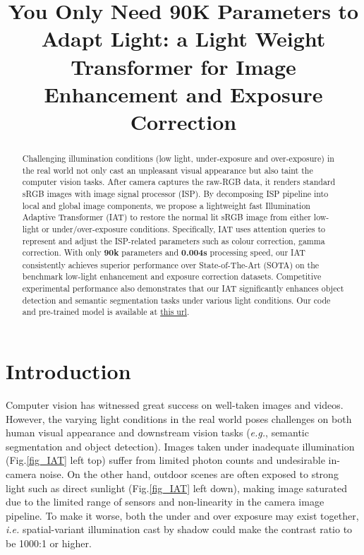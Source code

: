 \documentclass{bmvc2k}
\title{You Only Need 90K Parameters to Adapt Light: a Light Weight Transformer for Image Enhancement and Exposure Correction}
\begin{document}
\maketitle

\begin{abstract}
Challenging illumination conditions (low light, under-exposure and over-exposure) in the real world not only cast an unpleasant visual appearance but also taint the computer vision tasks. After camera captures the raw-RGB data, it renders standard sRGB images with  image signal processor (ISP). By decomposing ISP pipeline into local and global image components, we propose a lightweight fast Illumination Adaptive Transformer (IAT) to restore the normal lit sRGB image from either low-light or under/over-exposure conditions. Specifically, IAT uses attention queries to represent and adjust the ISP-related parameters such as colour correction, gamma correction. With only \textbf{90k} parameters and \textbf{0.004s} processing speed, our IAT consistently achieves superior performance over State-of-The-Art (SOTA) on the benchmark low-light enhancement and exposure correction datasets. Competitive experimental performance also demonstrates that our IAT significantly enhances object detection and semantic segmentation tasks under various light conditions. Our code and pre-trained model is available at \href{https://github.com/cuiziteng/Illumination-Adaptive-Transformer}{this url}.


\end{abstract}

\vspace{-5mm}
\section{Introduction}
\label{sec:intro}
Computer vision has witnessed great success on well-taken images and videos. However, the varying light conditions in the real world poses challenges on both human visual appearance and downstream vision tasks (\textit{e.g.}, semantic segmentation and object detection). Images taken under inadequate illumination (Fig.\ref{fig_IAT} left top) suffer from limited photon counts and undesirable in-camera noise. On the other hand, outdoor scenes are often exposed to strong light such as direct sunlight (Fig.\ref{fig_IAT} left down), making image saturated due to the limited range of sensors and non-linearity in the camera image pipeline. To make it worse, both the under and over exposure may exist together, \textit{i.e.} spatial-variant illumination cast by shadow could make the contrast ratio to be 1000:1 or higher. 
\end{document}
